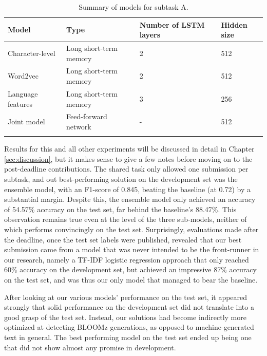 \begin{table}[h]
    \centering
    \begin{tabular}{llll}
        \hline
        \textbf{Model}    & \textbf{Type}          & \textbf{Number of LSTM layers} & \textbf{Hidden size} \\
        \hline
        Character-level   & Long short-term memory & 2                              & 512                  \\
        Word2vec          & Long short-term memory & 2                              & 512                  \\
        Language features & Long short-term memory & 3                              & 256                  \\
        Joint model       & Feed-forward network   & -                              & 512                  \\
        \hline
        \vspace{0.1cm}
    \end{tabular}
    \caption{Summary of models for subtask A.}
    \label{tab:a_models}
\end{table}

Results for this and all other experiments will be discussed in detail in Chapter \ref{sec:discussion}, but it makes sense to give a few notes before moving on to the post-deadline contributions.
The shared task only allowed one submission per subtask, and out best-performing solution on the development set was the ensemble model, with an F1-score of 0.845, beating the baseline (at 0.72) by a substantial margin.
Despite this, the ensemble model only achieved an accuracy of 54.57\% accuracy on the test set, far behind the baseline's 88.47\%.
This observation remains true even at the level of the three sub-models, neither of which performs convincingly on the test set.
Surprisingly, evaluations made after the deadline, once the test set labels were published, revealed that our best submission came from a model that was never intended to be the front-runner in our research, namely a TF-IDF logistic regression approach that only reached 60\% accuracy on the development set, but achieved an impressive 87\% accuracy on the test set, and was thus our only model that managed to bear the baseline.

After looking at our various models' performance on the test set, it appeared strongly that solid performance on the development set did not translate into a good grasp of the test set.
Instead, our solutions had become indirectly more optimized at detecting BLOOMz generations, as opposed to machine-generated text in general.
The best performing model on the test set ended up being one that did not show almost any promise in development.

